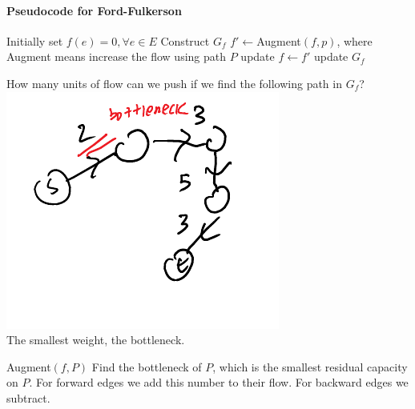 \documentclass[12 pt]{article}
\begin{document}
        \paragraph{Pseudocode for Ford-Fulkerson}
        \begin{algorithmic}
          \State Initially set $f(e)=0, \forall e \in E$
          \State Construct $G_f$
            \State $f' \gets$Augment$(f,p)$, where Augment means
            increase the flow using path $P$
            \State update $f \gets f'$
            \State update $G_f$
         \EndWhile
        \end{algorithmic}
        How many units of flow can we push if we find the following
        path in $G_f$?
        \\ \includegraphics[width=.7\textwidth]{i12.pdf}
        \\ The smallest weight, the bottleneck.
        \begin{algorithmic}
          \State Augment$(f,P)$
          \State Find the bottleneck of $P$, which is the smallest
          residual capacity on $P$.
          \State For forward edges we add this number to their flow.
          \State For backward edges we subtract.
        \end{algorithmic}
\end{document}
